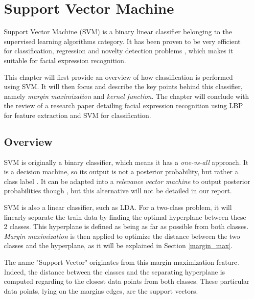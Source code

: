 \chapter{Support Vector Machine}
\label{chap:svm}

\noindent Support Vector Machine (SVM) is a binary linear classifier belonging to the supervised learning algorithms category. It has been proven to be very efficient for classification, regression and novelty detection problems \cite{BIS06}, which makes it suitable for facial expression recognition.
\newline

\noindent This chapter will first provide an overview of how classification is performed using SVM. It will then focus and describe the key points behind this classifier, namely \textit{margin maximization} and \textit{kernel function}. The chapter will conclude with the review of a research paper detailing facial expression recognition using LBP for feature extraction and SVM for classification.
\newline

\section{Overview}
\label{svm_overview}

\vspace{\baselineskip}
\noindent SVM is originally a binary classifier, which means it has a \textit{one-vs-all} approach. It is a decision machine, so its output is not a posterior probability, but rather a class label \cite{BIS06}.  It can be adapted into a \textit{relevance vector machine} to output posterior probabilities though \cite{BIS06}, but this alternative will not be detailed in our report.
\newline

\noindent SVM is also a linear classifier, such as LDA. For a two-class problem, it will linearly separate the train data by finding the optimal hyperplane between these 2 classes. This hyperplane is defined as being as far as possible from both classes. \textit{Margin maximization} is then applied to optimize the distance between the two classes and the hyperplane, as it will be explained in Section \ref{margin_max}.
\newline

\noindent The name "Support Vector" originates from this margin maximization feature. Indeed, the distance between the classes and the separating hyperplane is computed regarding to the closest data points from both classes. These particular data points, lying on the margins edges, are the support vectors. %
\newline

